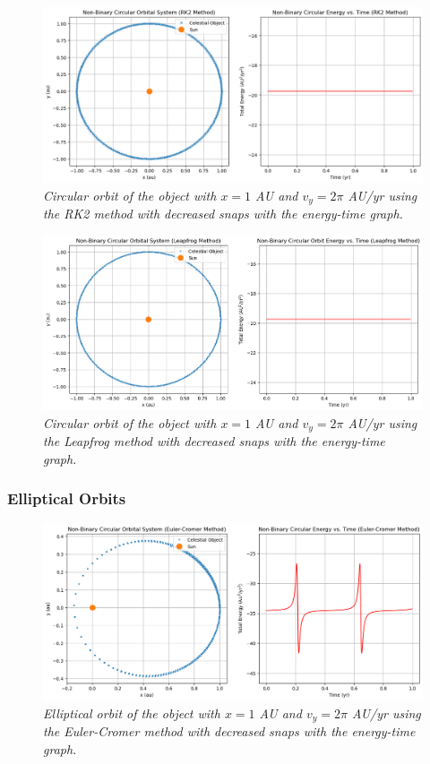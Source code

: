 \documentclass[11 pt, a4paper]{article}
\begin{document}
\begin{figure}[H]
  \includegraphics[width=0.7\linewidth]{RK2/rk2circularincrease.png}
  \centering
  \caption{\textit{Circular orbit of the object with $x = 1$ AU and $v_y = 2\pi$ AU/yr using the RK2 method with decreased snaps with the energy-time graph.}} 
\end{figure}

\begin{figure}[H]
  \includegraphics[width=0.7\linewidth]{Leapfrog/leapfrogcircularincrease.png}
  \centering
  \caption{\textit{Circular orbit of the object with $x = 1$ AU and $v_y = 2\pi$ AU/yr using the Leapfrog method with decreased snaps with the energy-time graph.}} 
\end{figure}

\subsubsection{Elliptical Orbits}
\begin{figure}[H]
  \includegraphics[width=0.7\linewidth]{Euler cromer/eulercromerellipticincrease.png}
  \centering
  \caption{\textit{Elliptical orbit of the object with $x = 1$ AU and $v_y = 2\pi$ AU/yr using the Euler-Cromer method with decreased snaps with the energy-time graph.}} 
\end{figure}
\end{document}
